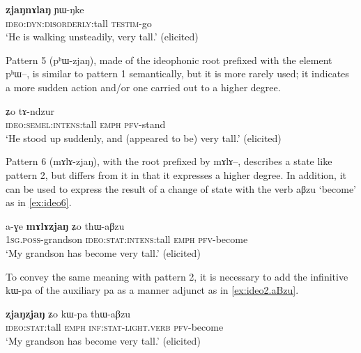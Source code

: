 \documentclass[oldfontcommands,oneside,a4paper,11pt]{article}
\newcommand{\ipa}[1]{{\phon \mbox{#1}}} %
\begin{document}
  \begin{exe} 
\ex  \label{ex:ideo4}
\gll 
 \ipa{\textbf{zjaŋnɤlaŋ}}  	  \ipa{ɲɯ-ŋke}  \\
     \textsc{ideo:dyn:disorderly}:tall   \textsc{testim}-go  \\
\glt `He is  walking unsteadily, very tall.'   (elicited)
 \end{exe} 
 
 
 Pattern 5 (\ipa{pʰɯ-zjaŋ}), made of the ideophonic root prefixed with the element \ipa{pʰɯ--}, is similar to pattern 1 semantically, but it is more rarely used; it indicates a more sudden action and/or one carried out to a higher degree.
 
  \begin{exe} 
\ex  \label{ex:ideo5}
\gll \ipa{\textbf{pʰɯzjaŋ}} \ipa{ʑo} 	\ipa{tɤ-ndzur}  \\
\textsc{ideo:semel:intens}:tall \textsc{emph} \textsc{pfv}-stand \\
\glt `He stood up suddenly, and (appeared to be) very tall.'  (elicited)
\end{exe}

Pattern 6 (\ipa{mɤlɤ-zjaŋ}), with the root prefixed by \ipa{mɤlɤ--}, describes a state like pattern 2, but differs from it in that it expresses a higher degree. In addition, it can be used to express the result of a change of state with the verb \ipa{aβzu} `become' as in \ref{ex:ideo6}.

 \begin{exe} 
\ex  \label{ex:ideo6}
\gll
\ipa{a-ɣe}  	\ipa{\textbf{mɤlɤzjaŋ}}  	\ipa{ʑo}  	\ipa{thɯ-aβzu}  \\
\textsc{1sg.poss}-grandson \textsc{ideo:stat:intens}:tall \textsc{emph} \textsc{pfv}-become \\
\glt `My grandson has become very tall.'  (elicited)
 \end{exe}

To convey the same meaning with pattern 2, it is necessary to add the infinitive   	\ipa{kɯ-pa} of the auxiliary \ipa{pa} as a manner adjunct as in \ref{ex:ideo2.aBzu}.
 
 \begin{exe} 
\ex  \label{ex:ideo2.aBzu}
\gll 
 \ipa{\textbf{zjaŋzjaŋ}}  	\ipa{ʑo}  	\ipa{kɯ-pa}  	\ipa{thɯ-aβzu}  \\
  \textsc{ideo:stat}:tall \textsc{emph} \textsc{inf:stat}-\textsc{light.verb} \textsc{pfv}-become \\
\glt `My grandson has become very tall.'  (elicited)
 \end{exe}
 
\end{document}
